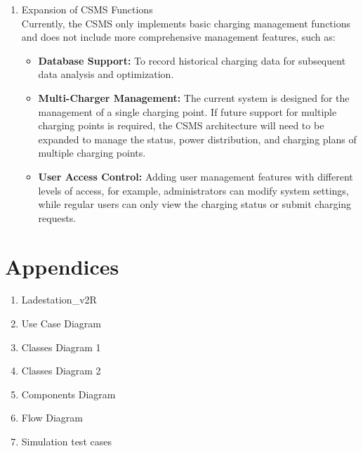 \documentclass[
english,
ruledheaders=section,%
class=report,%
thesis={type=Report},%
accentcolor=9c,%
custommargins=true,%
marginpar=false,%
parskip=half-,%
fontsize=11pt,%
logofile={img/tuda_logo.pdf}, %
]{tudapub}
\begin{document}
\begin{enumerate}
            \item Expansion of CSMS Functions\\
            Currently, the CSMS only implements basic charging management functions and does not include more comprehensive management features, such as:
            \begin{itemize}
                \item \textbf{Database Support:} To record historical charging data for subsequent data analysis and optimization.
                \item \textbf{Multi-Charger Management:} The current system is designed for the management of a single charging point. If future support for multiple charging points is required, the CSMS architecture will need to be expanded to manage the status, power distribution, and charging plans of multiple charging points.
                \item \textbf{User Access Control:} Adding user management features with different levels of access, for example, administrators can modify system settings, while regular users can only view the charging status or submit charging requests.
            \end{itemize}

        \end{enumerate}


        \printbibliography

        \chapter{Appendices}
        \begin{enumerate}
            \item Ladestation\_v2R
            \item Use Case Diagram
            \item Classes Diagram 1
            \item Classes Diagram 2
            \item Components Diagram
            \item Flow Diagram
            \item Simulation test cases
        \end{enumerate}
\end{document}
